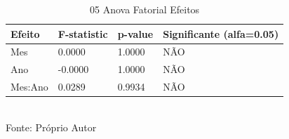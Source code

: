 \begin{table}[H]
\centering
\small
\caption{05 Anova Fatorial Efeitos}
\label{tab:07_05_ANOVA_Fatorial}
\begin{tabular}{|p{2.5cm}|p{2.5cm}|p{1cm}|p{4cm}|}
\hline
\textbf{Efeito} & \textbf{F-statistic} & \textbf{p-value} & \textbf{Significante (alfa=0.05)} \\
\hline
Mes & 0.0000 & 1.0000 & NÃO \\
Ano & -0.0000 & 1.0000 & NÃO \\
Mes:Ano & 0.0289 & 0.9934 & NÃO \\
\hline
\end{tabular}
\\ \small Fonte: Próprio Autor
\end{table}
